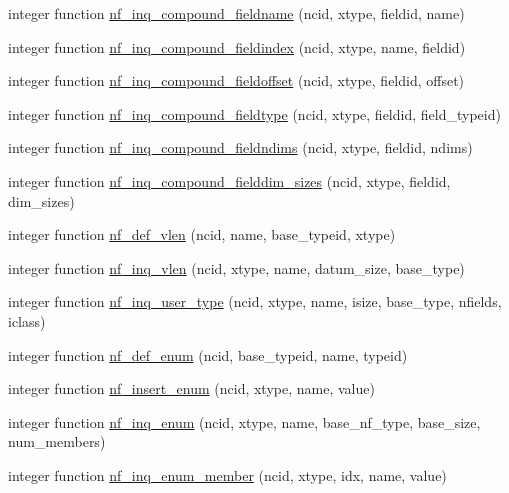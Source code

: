 \begin{DoxyCompactItemize}
\item 
integer function \hyperlink{nf__nc4_8f90_aa35eb99973113fa518f8f8b408350ed8}{nf\+\_\+inq\+\_\+compound\+\_\+fieldname} (ncid, xtype, fieldid, name)
\item 
integer function \hyperlink{nf__nc4_8f90_a91bb477a131a3d0d30500392067fed6c}{nf\+\_\+inq\+\_\+compound\+\_\+fieldindex} (ncid, xtype, name, fieldid)
\item 
integer function \hyperlink{nf__nc4_8f90_a176c098f3bb7affadd26ec756508acfe}{nf\+\_\+inq\+\_\+compound\+\_\+fieldoffset} (ncid, xtype, fieldid, offset)
\item 
integer function \hyperlink{nf__nc4_8f90_aafecf41e81f700e9e77b7398d8e28919}{nf\+\_\+inq\+\_\+compound\+\_\+fieldtype} (ncid, xtype, fieldid, field\+\_\+typeid)
\item 
integer function \hyperlink{nf__nc4_8f90_ad75401d8a7c1ae30532f730d8a540815}{nf\+\_\+inq\+\_\+compound\+\_\+fieldndims} (ncid, xtype, fieldid, ndims)
\item 
integer function \hyperlink{nf__nc4_8f90_a32b52a996075c7a99a8ced71f7b8ab04}{nf\+\_\+inq\+\_\+compound\+\_\+fielddim\+\_\+sizes} (ncid, xtype, fieldid, dim\+\_\+sizes)
\item 
integer function \hyperlink{nf__nc4_8f90_a6cb82d26e8a2698ba9a018b38c70dad9}{nf\+\_\+def\+\_\+vlen} (ncid, name, base\+\_\+typeid, xtype)
\item 
integer function \hyperlink{nf__nc4_8f90_aff32bcfd6e5c1c39712b15df69d3e87c}{nf\+\_\+inq\+\_\+vlen} (ncid, xtype, name, datum\+\_\+size, base\+\_\+type)
\item 
integer function \hyperlink{nf__nc4_8f90_a667616f8f1c6cda00fdd52a4f2d186d3}{nf\+\_\+inq\+\_\+user\+\_\+type} (ncid, xtype, name, isize, base\+\_\+type, nfields, iclass)
\item 
integer function \hyperlink{nf__nc4_8f90_a9d6c5d97364962500ad4a646364d6bc8}{nf\+\_\+def\+\_\+enum} (ncid, base\+\_\+typeid, name, typeid)
\item 
integer function \hyperlink{nf__nc4_8f90_aff430fba54005f12cce6001f6bee168e}{nf\+\_\+insert\+\_\+enum} (ncid, xtype, name, value)
\item 
integer function \hyperlink{nf__nc4_8f90_aa8e61e8be696b03461c961b19d3505ec}{nf\+\_\+inq\+\_\+enum} (ncid, xtype, name, base\+\_\+nf\+\_\+type, base\+\_\+size, num\+\_\+members)
\item 
integer function \hyperlink{nf__nc4_8f90_a5a7fd353f04107f6f0ffbf17dc113e02}{nf\+\_\+inq\+\_\+enum\+\_\+member} (ncid, xtype, idx, name, value)
\item 

\end{DoxyCompactItemize}
